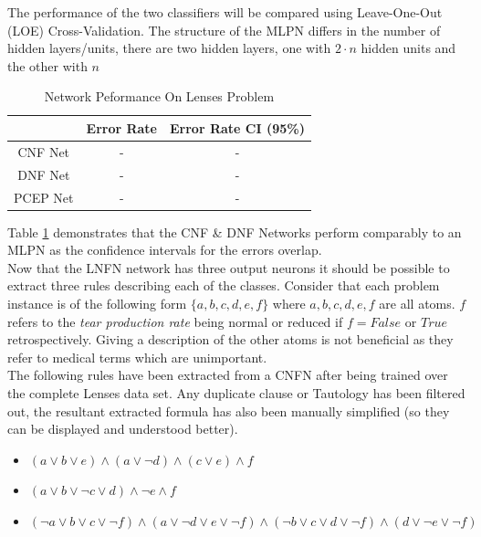 The performance of the two classifiers will be compared using Leave-One-Out (LOE) Cross-Validation. The structure of the MLPN differs in the number of hidden layers/units, there are two hidden layers, one with $2 \cdot n$ hidden units and the other with $n$

\begin{table}[H]
	\begin{center}
		\begin{tabular}{| c | c | c |}
			\hline
			& Error Rate & Error Rate CI (95\%) \\
			\hline
			\hline
			CNF Net & - & - \\
			\hline
			DNF Net & - & - \\
			\hline
			PCEP Net & - & - \\
			\hline
		\end{tabular}
	\end{center}
	\caption{Network Peformance On Lenses Problem}
	\label{tab:lenses-peformance-comp}
\end{table}

Table \ref{tab:lenses-peformance-comp} demonstrates that the CNF \& DNF Networks perform comparably to an MLPN as the confidence intervals for the errors overlap.\\ 

Now that the LNFN network has three output neurons it should be possible to extract three rules describing each of the classes. Consider that each problem instance is of the following form $\{a, b, c, d, e, f\}$ where $a,b,c,d,e,f$ are all atoms. $f$ refers to the \textit{tear production rate} being normal or reduced if $f = False$ or $True$ retrospectively. Giving a description of the other atoms is not beneficial as they refer to medical terms which are unimportant.\\

The following rules have been extracted from a CNFN after being trained over the complete Lenses data set. Any duplicate clause or Tautology has been filtered out, the resultant extracted formula has also been manually simplified (so they can be displayed and understood better).

\begin{itemize}
	\item {} $(a \lor b \lor e) \land (a \lor \lnot d) \land (c \lor e) \land f$
	\item {} $(a \lor b \lor \lnot c \lor d) \land \lnot e \land f$
	\item {} $(\lnot a \lor b \lor c \lor \lnot f) \land (a \lor \lnot d \lor e \lor \lnot f) \land (\lnot b \lor c \lor d \lor \lnot f) \land (d \lor \lnot e \lor \lnot f)$
\end{itemize}

